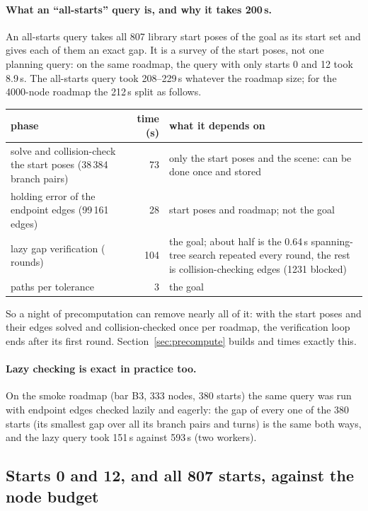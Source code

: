 \paragraph{What an ``all-starts'' query is, and why it takes 200\,s.}
An all-starts query takes all 807 library start poses of the goal as its start
set and gives each of them an exact gap. It is a survey of the start poses, not
one planning query: on the same roadmap, the query with only starts 0 and 12
took 8.9\,s. The all-starts query took 208--229\,s whatever the roadmap size;
for the 4000-node roadmap the 212\,s split as follows.
\begin{center}
\footnotesize
\begin{tabular}{@{}>{\raggedright\arraybackslash}p{4.3cm} r >{\raggedright\arraybackslash}p{8.3cm}@{}}
\toprule
phase & time (s) & what it depends on \\
\midrule
solve and collision-check the start poses (38\,384 branch pairs) & 73 & only the start poses and the scene: can be done once and stored \\
holding error of the endpoint edges (99\,161 edges) & 28 & start poses and roadmap; not the goal \\
lazy gap verification (\PrmVerifyRounds{} rounds) & 104 & the goal; about half is the 0.64\,s spanning-tree search repeated every round, the rest is collision-checking \PrmLazyChecked{} edges (1231 blocked) \\
paths per tolerance & 3 & the goal \\
\bottomrule
\end{tabular}
\end{center}
So a night of precomputation can remove nearly all of it: with the start poses
and their edges solved and collision-checked once per roadmap, the verification
loop ends after its first round. Section~\ref{sec:precompute} builds and times
exactly this.

\paragraph{Lazy checking is exact in practice too.}
On the smoke roadmap (bar B3, 333 nodes, 380 starts) the same query was run with
endpoint edges checked lazily and eagerly: the gap of every one of the 380
starts (its smallest gap over all its branch pairs and turns) is the same both
ways, and the lazy query took 151\,s against 593\,s (two workers).

\subsection{Starts 0 and 12, and all 807 starts, against the node budget}

